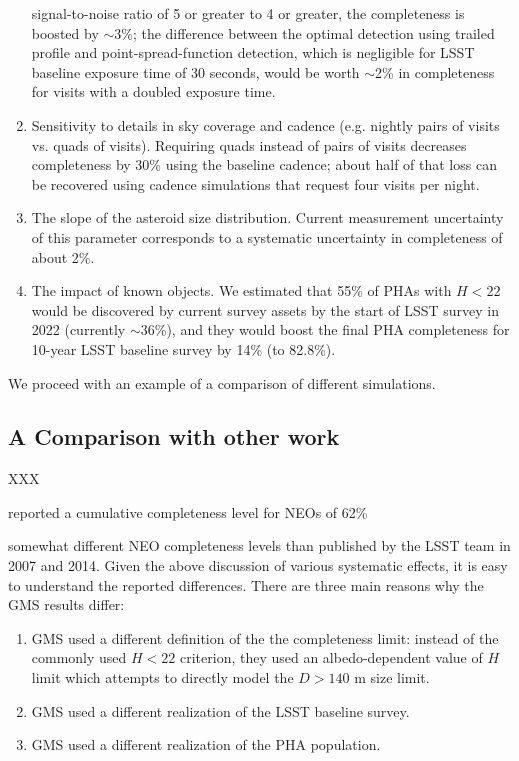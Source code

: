 \begin{enumerate}
          signal-to-noise ratio of 5 or greater to 4 or greater, the completeness is boosted by $\sim$3\%;
          the difference between the optimal detection using trailed profile and point-spread-function
          detection, which is negligible for LSST baseline exposure time of 30 seconds, would be worth $\sim$2\%
          in completeness for visits with a doubled exposure time.
\item Sensitivity to details in sky coverage and cadence (e.g. nightly pairs of visits vs. quads of visits).
          Requiring quads instead of pairs of visits decreases completeness by 30\% using the baseline cadence;
          about half of that loss can be recovered using cadence simulations that request four visits per night.
\item The slope of the asteroid size distribution. Current measurement uncertainty of this parameter
          corresponds to a systematic uncertainty in completeness of about 2\%.
\item The impact of known objects. We estimated that 55\% of PHAs with $H<22$ would be discovered
          by current survey assets by the start of LSST survey in 2022 (currently $\sim$36\%), and they would
          boost the final PHA completeness for 10-year LSST baseline survey by 14\% (to 82.8\%).
\end{enumerate}

We proceed with an example of a comparison of different simulations.

\subsection{A Comparison with other work \label{sec:other}}



XXX

\citet*[][hereafter GMS]{GMS2016}
reported a cumulative completeness level for NEOs of 62\%

somewhat different NEO completeness levels than published by the LSST team
in 2007 and 2014. Given the above discussion of various systematic effects, it is easy to understand
the reported differences. There are three main reasons why the GMS results differ:
\begin{enumerate}
\item GMS used a different definition of the the completeness limit: instead of 
          the commonly used $H<22$ criterion, they used an albedo-dependent value 
          of $H$ limit which attempts to directly model the $D>140$ m size limit.
\item GMS used a different realization of the LSST baseline survey.
\item GMS used a different realization of the PHA population.
\end{enumerate}


